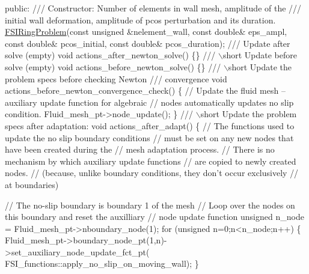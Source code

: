 \begin{DoxyCodeInclude}
\textcolor{keyword}{public}:
\textcolor{comment}{}
\textcolor{comment}{ /// Constructor: Number of elements in wall mesh, amplitude of the}
\textcolor{comment}{ /// initial wall deformation, amplitude of pcos perturbation and its duration.}
\textcolor{comment}{} \hyperlink{classFSIRingProblem}{FSIRingProblem}(\textcolor{keyword}{const} \textcolor{keywordtype}{unsigned} &nelement\_wall,
                \textcolor{keyword}{const} \textcolor{keywordtype}{double}& eps\_ampl, \textcolor{keyword}{const} \textcolor{keywordtype}{double}& pcos\_initial,
                \textcolor{keyword}{const} \textcolor{keywordtype}{double}& pcos\_duration);
\textcolor{comment}{}
\textcolor{comment}{ /// Update after solve (empty)}
\textcolor{comment}{} \textcolor{keywordtype}{void} actions\_after\_newton\_solve() \{\}
\textcolor{comment}{}
\textcolor{comment}{ /// \(\backslash\)short Update before solve (empty)}
\textcolor{comment}{} \textcolor{keywordtype}{void} actions\_before\_newton\_solve() \{\}
\textcolor{comment}{}
\textcolor{comment}{ /// \(\backslash\)short Update the problem specs before checking Newton}
\textcolor{comment}{ /// convergence}
\textcolor{comment}{} \textcolor{keywordtype}{void} actions\_before\_newton\_convergence\_check() 
 \{
  \textcolor{comment}{// Update the fluid mesh -- auxiliary update function for algebraic}
  \textcolor{comment}{// nodes automatically updates no slip condition.}
  Fluid\_mesh\_pt->node\_update(); 
 \}
\textcolor{comment}{}
\textcolor{comment}{ /// \(\backslash\)short Update the problem specs after adaptation:}
\textcolor{comment}{} \textcolor{keywordtype}{void} actions\_after\_adapt() 
  \{
   \textcolor{comment}{// The functions used to update the no slip boundary conditions }
   \textcolor{comment}{// must be set on any new nodes that have been created during the }
   \textcolor{comment}{// mesh adaptation process. }
   \textcolor{comment}{// There is no mechanism by which auxiliary update functions }
   \textcolor{comment}{// are copied to newly created nodes.}
   \textcolor{comment}{// (because, unlike boundary conditions, they don't occur exclusively }
   \textcolor{comment}{//  at boundaries)}

   \textcolor{comment}{// The no-slip boundary is boundary 1 of the mesh}
   \textcolor{comment}{// Loop over the nodes on this boundary and reset the auxilliary}
   \textcolor{comment}{// node update function}
   \textcolor{keywordtype}{unsigned} n\_node = Fluid\_mesh\_pt->nboundary\_node(1);
   \textcolor{keywordflow}{for} (\textcolor{keywordtype}{unsigned} n=0;n<n\_node;n++)
    \{
     Fluid\_mesh\_pt->boundary\_node\_pt(1,n)->set\_auxiliary\_node\_update\_fct\_pt(
      FSI\_functions::apply\_no\_slip\_on\_moving\_wall); 
    \}


\end{DoxyCodeInclude}
